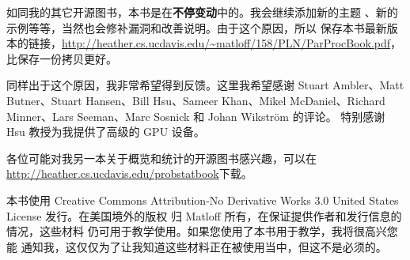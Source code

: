 如同我的其它开源图书，本书是在\textbf{不停变动}中的。我会继续添加新的主题
、新的示例等等，当然也会修补漏洞和改善说明。由于这个原因，所以
保存本书最新版本的链接，\url{http://heather.cs.ucdavis.edu/~matloff/158/PLN/ParProcBook.pdf}，
比保存一份拷贝更好。

同样出于这个原因，我非常希望得到反馈。这里我希望感谢 Stuart
Ambler、Matt Butner、Stuart Hansen、Bill Hsu、Sameer Khan、Mikel
McDaniel、Richard Minner、Lars Seeman、Marc Sosnick 和 Johan Wikstr{\"o}m 的评论。
特别感谢 Hsu 教授为我提供了高级的 GPU 设备。

各位可能对我另一本关于概览和统计的开源图书感兴趣，可以在
\url{http://heather.cs.ucdavis.edu/probstatbook}下载。

本书使用 Creative Commons Attribution-No Derivative
Works 3.0 United States License 发行。在美国境外的版权
归 Matloff 所有，在保证提供作者和发行信息的情况，这些材料
仍可用于教学使用。如果您使用了本书用于教学，我将很高兴您能
通知我，这仅仅为了让我知道这些材料正在被使用当中，但这不是必须的。

